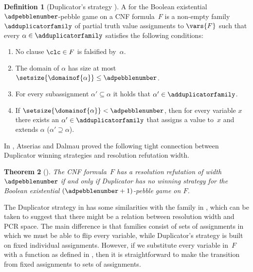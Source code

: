 \documentclass[11pt]{article}
\numberwithin{equation}{section}
\newtheorem{theorem}{Theorem}[section]
\theoremstyle{definition}
\newtheorem{definition}[theorem]{Definition}
\theoremstyle{plain}
\begin{document}
\begin{definition}[Duplicator's strategy
  \cite{AD08CombinatoricalCharacterization}]
  \label{def:AD-game}  
%
%
%
%
%
%
%
%
  A
  for the Boolean existential $\adpebblenumber$-pebble game on 
  a CNF formula~$F$ is a non-empty family $\adduplicatorfamily$ of
  partial truth value assignments 
%
  to $\vars{F}$
  such that every 
  $\alpha \in \adduplicatorfamily$ 
  satisfies the following conditions:
  \begin{enumerate}
  \item
    No clause $\clc \in F$ is falsified by~$\alpha$.
  \item
    The domain of $\alpha$ has size at most
    $\setsize{\domainof{\alpha}} \leq \adpebblenumber$.
  \item 
    For every 
    subassignment
    $\alpha' \subseteq \alpha$ 
    it holds that
    $\alpha' \in \adduplicatorfamily$.
%
%
%
%
  \item 
    If $\setsize{\domainof{\alpha}} < \adpebblenumber$, then for every
    variable $x$ there exists an $\alpha' \in \adduplicatorfamily$ 
    that assigns a value to~$x$
    and extends $\alpha$ 
    (\ieComma $\alpha' \supseteq \alpha$).
%
%
%
%
  \end{enumerate}
\end{definition}

In \cite{AD08CombinatoricalCharacterization}, Atserias and Dalmau
proved the following tight connection between Duplicator winning strategies 
and resolution refutation width.
%
%

\begin{theorem}[\cite{AD08CombinatoricalCharacterization}]
  \label{th:ADWidthCharacterization}
%
%
%
  The CNF formula~$F$ has a resolution refutation of width
  $\adpebblenumber$ if and only if Duplicator has no winning strategy
  for the Boolean existential $(\adpebblenumber + 1)$-pebble game on $F$.
\end{theorem}

%
%
%
%
%
%
%
%
%
%
%
%
%
%
%
%

The Duplicator strategy in  has some similarities
with the \kextendibleNok{} family in , which
can be taken to suggest that there might be a relation between
resolution width and PCR space. The main difference is that
\kextendibleNok families consist of sets of assignments in
which we must be able to flip every variable, while Duplicator's
strategy is built on fixed individual assignments. However,
if we substitute every variable in~$F$ with a \nonauthor{} function as
defined in , then it is straightforward to
make the transition from fixed assignments to sets of \flippable assignments.
%
%
%
%
%
%
%
\end{document}
